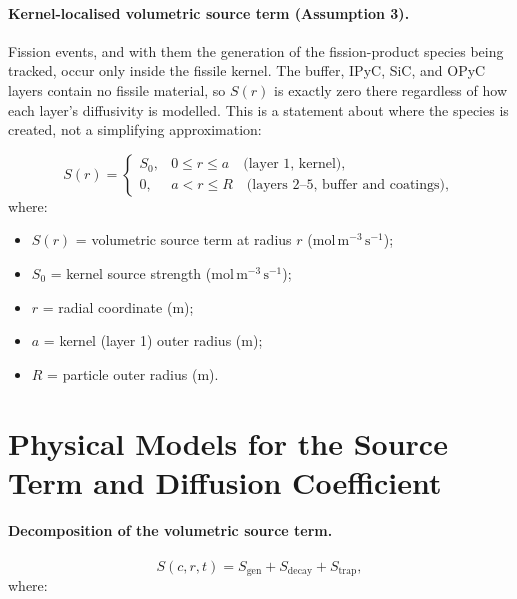 \documentclass[11pt,a4paper]{article}
\newcommand{\conc}{c}
\begin{document}
\paragraph{Kernel-localised volumetric source term (Assumption 3).}
Fission events, and with them the generation of the fission-product species being tracked, occur only inside the fissile kernel. The buffer, IPyC, SiC, and OPyC layers contain no fissile material, so $S(r)$ is exactly zero there regardless of how each layer's diffusivity is modelled. This is a statement about where the species is created, not a simplifying approximation:

\begin{equation}
  S(r) =
  \begin{cases}
    S_0, & 0 \le r \le a \quad \text{(layer 1, kernel)}, \\
    0,   & a < r \le R \quad \text{(layers 2--5, buffer and coatings)},
  \end{cases}
  \label{eq:kernel-source}
\end{equation}
\vspace{-0.3em}
\noindent where:

\begin{itemize}[leftmargin=1.6em,itemsep=1pt,topsep=3pt,parsep=0pt]
  \item $S(r)$ = volumetric source term at radius $r$ ($\mathrm{mol\,m^{-3}\,s^{-1}}$);
  \item $S_0$ = kernel source strength ($\mathrm{mol\,m^{-3}\,s^{-1}}$);
  \item $r$ = radial coordinate ($\mathrm{m}$);
  \item $a$ = kernel (layer 1) outer radius ($\mathrm{m}$);
  \item $R$ = particle outer radius ($\mathrm{m}$).
\end{itemize}



\section{Physical Models for the Source Term and Diffusion Coefficient}
\label{sec:source-terms}

\paragraph{Decomposition of the volumetric source term.}

\begin{equation}
  S(\conc, r, t) = S_{\text{gen}} + S_{\text{decay}} + S_{\text{trap}} ,
  \label{eq:source-decomposition}
\end{equation}
\vspace{-0.3em}
\noindent where:
\end{document}
